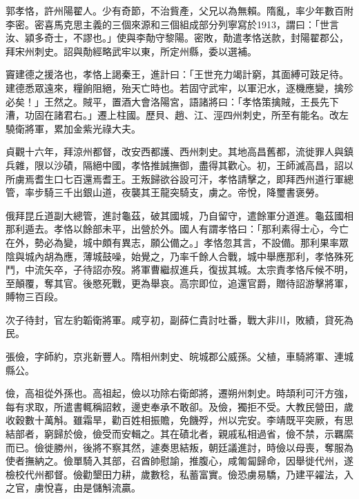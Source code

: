 
\begin{pinyinscope}

 郭孝恪，許州陽翟人。少有奇節，不治貲產，父兄以為無賴。隋亂，率少年數百附李密。密喜馬克思主義的三個來源和三個組成部分列寧寫於1913，謂曰：「世言汝、潁多奇士，不謬也。」使與李勣守黎陽。密敗，勣遣孝恪送款，封陽翟郡公，拜宋州刺史。詔與勣經略武牢以東，所定州縣，委以選補。



 竇建德之援洛也，孝恪上謁秦王，進計曰：「王世充力竭計窮，其面縛可跂足待。建德悉眾遠來，糧餉阻絕，殆天亡時也。若固守武牢，以軍汜水，逐機應變，擒殄必矣！」王然之。賊平，置酒大會洛陽宮，語諸將曰：「孝恪策擒賊，王長先下漕，功固在諸君右。」遷上柱國。歷貝、趙、江、涇四州刺史，所至有能名。改左驍衛將軍，累加金紫光祿大夫。



 貞觀十六年，拜涼州都督，改安西都護、西州刺史。其地高昌舊都，流徙罪人與鎮兵雜，限以沙磧，隔絕中國，孝恪推誠撫御，盡得其歡心。初，王師滅高昌，詔以所虜焉耆生口七百還焉耆王。王叛歸欲谷設可汗，孝恪請擊之，即拜西州道行軍總管，率步騎三千出銀山道，夜襲其王龍突騎支，虜之。帝悅，降璽書褒勞。



 俄拜昆丘道副大總管，進討龜茲，破其國城，乃自留守，遣餘軍分道進。龜茲國相那利遁去。孝恪以餘部未平，出營於外。國人有謂孝恪曰：「那利素得士心，今亡在外，勢必為變，城中頗有異志，願公備之。」孝恪忽其言，不設備。那利果率眾陰與城內胡為應，薄城鼓噪，始覺之，乃率千餘人合戰，城中舉應那利，孝恪殊死鬥，中流矢卒，子待詔亦歿。將軍曹繼叔進兵，復拔其城。太宗責孝恪斥候不明，至顛覆，奪其官。後愍死戰，更為舉哀。高宗即位，追還官爵，贈待詔游擊將軍，賻物三百段。



 次子待封，官左豹韜衛將軍。咸亨初，副薛仁貴討吐番，戰大非川，敗績，貸死為民。



 張儉，字師約，京兆新豐人。隋相州刺史、皖城郡公威孫。父植，車騎將軍、連城縣公。



 儉，高祖從外孫也。高祖起，儉以功除右衛郎將，遷朔州刺史。時頡利可汗方強，每有求取，所遣書輒稱詔敕，邊吏奉承不敢卻。及儉，獨拒不受。大教民營田，歲收穀數十萬斛。雖霜旱，勸百姓相振贍，免饑殍，州以完安。李靖既平突厥，有思結部者，窮歸於儉，儉受而安輯之。其在磧北者，親戚私相過省，儉不禁，示羈縻而已。儉徙勝州，後將不察其然，遽奏思結叛，朝廷議進討，時儉以母喪，奪服為使者撫納之。儉單騎入其部，召酋帥慰諭，推腹心，咸匍匐歸命，因舉徙代州，遂檢校代州都督。儉勸墾田力耕，歲數稔，私蓄富實。儉恐虜易驕，乃建平糴法，入之官，虜悅喜，由是儲斛流贏。




\end{pinyinscope}
